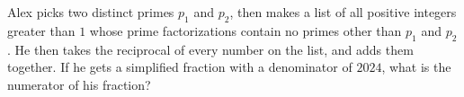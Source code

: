 Alex picks two distinct primes $p_1$ and $p_2$, then makes a list of all positive integers greater than $1$ whose prime factorizations contain no primes other than $p_1$ and $p_2$. He then takes the reciprocal of every number on the list, and adds them together. If he gets a simplified fraction with a denominator of $2024$, what is the numerator of his fraction?
